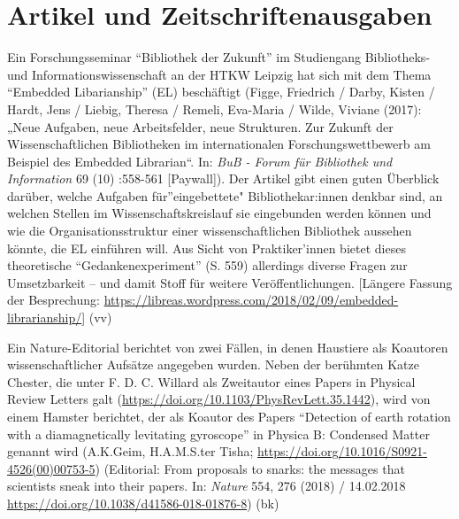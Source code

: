 \documentclass[a4paper,
fontsize=11pt,
oneside,
numbers=noperiodatend,
parskip=half-,
bibliography=totoc,
final
]{scrartcl}
\begin{document}
\hypertarget{artikel-und-zeitschriftenausgaben}{%
\section{Artikel und
Zeitschriftenausgaben}\label{artikel-und-zeitschriftenausgaben}}

Ein Forschungsseminar \enquote{Bibliothek der Zukunft} im Studiengang
Bibliotheks- und Informationswissenschaft an der HTKW Leipzig hat sich
mit dem Thema \enquote{Embedded Libarianship} (EL) beschäftigt (Figge,
Friedrich / Darby, Kisten / Hardt, Jens / Liebig, Theresa / Remeli,
Eva-Maria / Wilde, Viviane (2017): „Neue Aufgaben, neue Arbeitsfelder,
neue Strukturen. Zur Zukunft der Wissenschaftlichen Bibliotheken im
internationalen Forschungswettbewerb am Beispiel des Embedded
Librarian\enquote{. In: \emph{BuB - Forum für Bibliothek und
Information} 69 (10) :558-561 {[}Paywall{]}). Der Artikel gibt einen
guten Überblick darüber, welche Aufgaben für}eingebettete"
Bibliothekar:innen denkbar sind, an welchen Stellen im
Wissenschaftskreislauf sie eingebunden werden können und wie die
Organisationsstruktur einer wissenschaftlichen Bibliothek aussehen
könnte, die EL einführen will. Aus Sicht von Praktiker'innen bietet
dieses theoretische \enquote{Gedankenexperiment} (S. 559) allerdings
diverse Fragen zur Umsetzbarkeit -- und damit Stoff für weitere
Veröffentlichungen. {[}Längere Fassung der Besprechung:
\url{https://libreas.wordpress.com/2018/02/09/embedded-librarianship/}{]}
(vv)

Ein Nature-Editorial berichtet von zwei Fällen, in denen Haustiere als
Koautoren wissenschaftlicher Aufsätze angegeben wurden. Neben der
berühmten Katze Chester, die unter F. D. C. Willard als Zweitautor eines
Papers in Physical Review Letters galt
(\url{https://doi.org/10.1103/PhysRevLett.35.1442}), wird von einem
Hamster berichtet, der als Koautor des Papers \enquote{Detection of
earth rotation with a diamagnetically levitating gyroscope} in Physica
B: Condensed Matter genannt wird (A.K.Geim, H.A.M.S.ter Tisha;
\url{https://doi.org/10.1016/S0921-4526(00)00753-5}) (Editorial: From
proposals to snarks: the messages that scientists sneak into their
papers. In: \emph{Nature} 554, 276 (2018) / 14.02.2018
\url{https://doi.org/10.1038/d41586-018-01876-8}) (bk)
\end{document}
